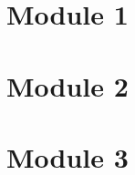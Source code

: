 

\def\title{Final Review Session}

\newcommand{\qitem}{\qpart\item}

\renewcommand{\labelenumi}{(\alph{enumi})} %
\renewcommand{\theenumi}{(\alph{enumi})} %
\renewcommand{\labelenumii}{\roman{enumii}.} %
\renewcommand{\theenumii}{\roman{enumii}.}

\maketitle

\vspace{0.5em}

\section{Module 1}


\section{Module 2}


\section{Module 3}



